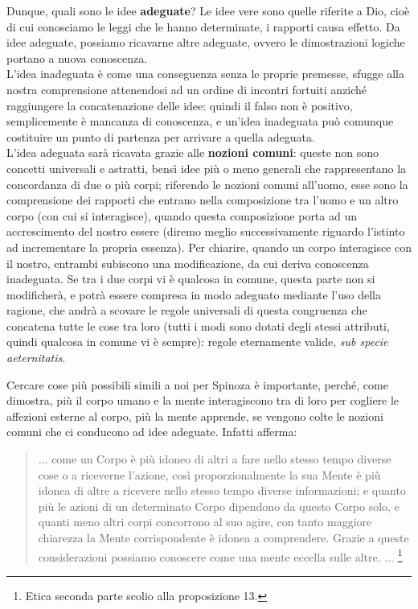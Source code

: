 Dunque, quali sono le idee \textbf{adeguate}? Le idee vere sono quelle riferite a Dio, cioè di cui conosciamo le leggi che le hanno determinate, i rapporti causa effetto. Da idee adeguate, possiamo ricavarne altre adeguate, ovvero le dimostrazioni logiche portano a nuova conoscenza.\\L'idea inadeguata è come una conseguenza senza le proprie premesse, sfugge alla nostra comprensione attenendosi ad un ordine di incontri fortuiti anziché raggiungere la concatenazione delle idee: quindi il falso non è positivo, semplicemente è mancanza di conoscenza, e un'idea inadeguata può comunque costituire un punto di partenza per arrivare a quella adeguata.\\
L'idea adeguata sarà ricavata grazie alle \textbf{nozioni comuni}: queste non sono concetti universali e astratti, bensì idee più o meno generali che rappresentano la concordanza di due o più corpi; riferendo le nozioni comuni all'uomo, esse sono la comprensione dei rapporti che entrano nella composizione tra l'uomo e un altro corpo (con cui si interagisce), quando questa composizione porta ad un accrescimento del nostro essere (diremo meglio successivamente riguardo l'istinto ad incrementare la propria essenza). Per chiarire, quando un corpo interagisce con il nostro, entrambi subiscono una modificazione, da cui deriva conoscenza inadeguata. Se tra i due corpi vi è qualcosa in comune, questa parte non si modificherà, e potrà essere compresa in modo adeguato mediante l'uso della ragione, che andrà a scovare le regole universali di questa congruenza che concatena tutte le cose tra loro (tutti i modi sono dotati degli stessi attributi, quindi qualcosa in comune vi è sempre): regole eternamente valide, \textit{sub specie aeternitatis}.

Cercare cose più possibili simili a noi per Spinoza è importante, perché, come dimostra, più il corpo umano e la mente interagiscono tra di loro per cogliere le affezioni esterne al corpo, più la mente apprende, se vengono colte le nozioni comuni che ci conducono ad idee adeguate. Infatti afferma:

\begin{quotation}
	\small ... come un Corpo è più idoneo di altri a fare nello stesso tempo diverse cose o a riceverne l’azione, così proporzionalmente la sua Mente è più idonea di altre a ricevere nello stesso tempo diverse informazioni; e quanto più le azioni di un determinato Corpo dipendono da questo Corpo
	solo, e quanti meno altri corpi concorrono al suo agire, con tanto maggiore chiarezza la
	Mente corrispondente è idonea a comprendere. Grazie a queste considerazioni possiamo
	conoscere come una mente eccella sulle altre. ... \footnote{Etica seconda parte scolio alla proposizione 13.}
\end{quotation}

